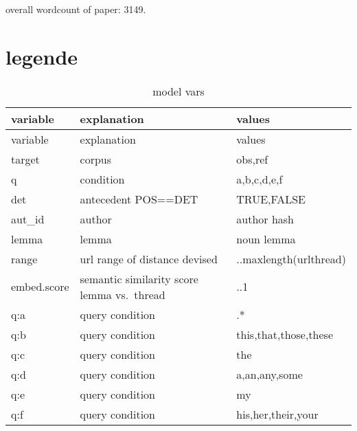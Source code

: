 \documentclass[
  12pt,
  oneside]{book}
\begin{document}
overall wordcount of paper: 3149.

\section{legende}\label{legende}

\begin{longtable}[]{@{}
  >{\raggedright\arraybackslash}p{}
  >{\raggedright\arraybackslash}p{}
  >{\raggedright\arraybackslash}p{}@{}}
\caption{\label{tab:legend}model vars}\tabularnewline
\toprule\noalign{}
\begin{minipage}[b]{\linewidth}\raggedright
variable
\end{minipage} & \begin{minipage}[b]{\linewidth}\raggedright
explanation
\end{minipage} & \begin{minipage}[b]{\linewidth}\raggedright
values
\end{minipage} \\
\midrule\noalign{}
\endfirsthead
\toprule\noalign{}
\begin{minipage}[b]{\linewidth}\raggedright
variable
\end{minipage} & \begin{minipage}[b]{\linewidth}\raggedright
explanation
\end{minipage} & \begin{minipage}[b]{\linewidth}\raggedright
values
\end{minipage} \\
\midrule\noalign{}
\endhead
\bottomrule\noalign{}
\endlastfoot
target & corpus & obs,ref \\
q & condition & a,b,c,d,e,f \\
det & antecedent POS==DET & TRUE,FALSE \\
aut\_id & author & author hash \\
lemma & lemma & noun lemma \\
range & url range of distance devised & 1..maxlength(urlthread) \\
embed.score & semantic similarity score lemma vs.~thread & 0..1 \\
q:a & query condition & .* \\
q:b & query condition & this,that,those,these \\
q:c & query condition & the \\
q:d & query condition & a,an,any,some \\
q:e & query condition & my \\
q:f & query condition & his,her,their,your \\
\end{longtable}
\end{document}
